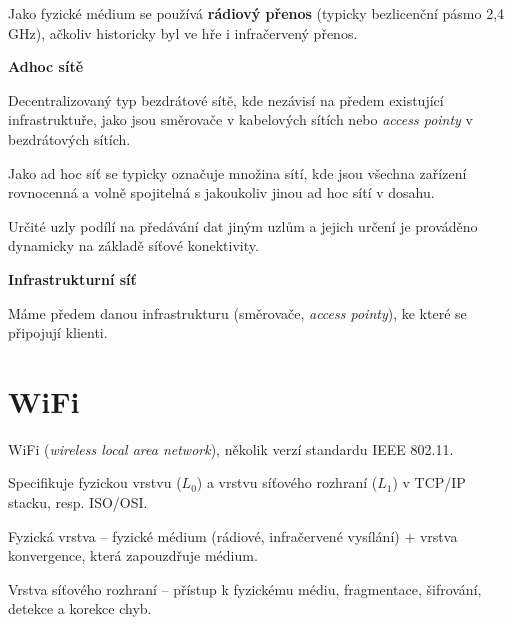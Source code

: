 \begin{compactitem}
    \item Jako fyzické médium se používá \textbf{rádiový přenos} (typicky bezlicenční pásmo 2,4\,GHz), ačkoliv historicky byl ve hře i infračervený přenos.

    \item \textbf{Adhoc sítě} \begin{compactitem}
        \item Decentralizovaný typ bezdrátové sítě, kde nezávisí na předem existující infrastruktuře, jako jsou směrovače v kabelových sítích nebo \textit{access pointy} v bezdrátových sítích.
        \item Jako ad hoc síť se typicky označuje množina sítí, kde jsou všechna zařízení rovnocenná a volně spojitelná s jakoukoliv jinou ad hoc sítí v dosahu.
        \item Určité uzly podílí na předávání dat jiným uzlům a jejich určení je prováděno dynamicky na základě síťové konektivity.
    \end{compactitem}

    \item \textbf{Infrastrukturní síť} \begin{compactitem}
        \item Máme předem danou infrastrukturu (směrovače, \textit{access pointy}), ke které se připojují klienti.
    \end{compactitem}
\end{compactitem}


\section{WiFi}

\begin{compactitem}
    \item WiFi (\textit{wireless local area network}), několik verzí standardu IEEE 802.11.

    \item Specifikuje fyzickou vrstvu ($L_0$) a vrstvu síťového rozhraní ($L_1$) v TCP/IP stacku, resp. ISO/OSI.

    \item Fyzická vrstva -- fyzické médium (rádiové, infračervené vysílání) + vrstva konvergence, která zapouzdřuje médium.

    \item Vrstva síťového rozhraní -- přístup k fyzickému médiu, fragmentace, šifrování, detekce a korekce chyb.
\end{compactitem}


